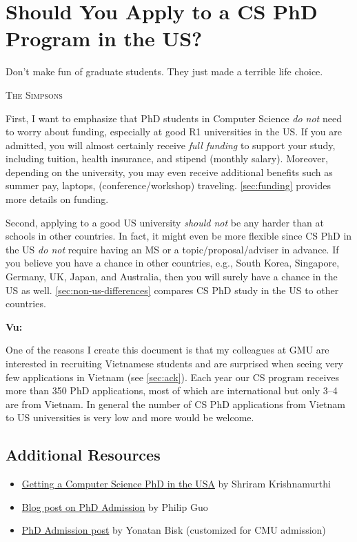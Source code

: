 \documentclass[oneside,11pt]{memoir}
\newenvironment{commentbox}[1][]{
  \small
  \begin{mybox}
    {\small \textbf{#1}}
  }{
  \end{mybox}
}
\begin{document}
\mainmatter
\chapter{Should You Apply to a CS PhD Program in the US?}\label{sec:should}

\epigraph{\vspace{-0.2in} Don't make fun of graduate students. They just made a terrible life choice.}{\textsc{The Simpsons}}

First, I want to emphasize that PhD students in Computer Science \emph{do not} need to worry about funding, especially at good R1
universities in the US. If you are admitted, you will almost certainly
receive \emph{full funding} to support your study, including tuition,
health insurance, and stipend (monthly salary). Moreover, depending on the university,
you may even receive additional benefits such as summer pay, laptops, (conference/workshop) traveling. \autoref{sec:funding} provides more details on funding.

Second, applying to a good US university \emph{should not} be any harder than at schools in other countries. In fact, it might even be more flexible since CS PhD in the US \emph{do not} require having an MS or a topic/proposal/adviser in advance. If you believe you have a chance in other countries, e.g., South Korea, Singapore, Germany, UK, Japan, and Australia, then you will surely have a chance in the US as well. \autoref{sec:non-us-differences} compares CS PhD study in the US to other countries.

\begin{commentbox}[Vu:]
  One of the reasons I create this document is that my colleagues at GMU are interested in recruiting Vietnamese students and are surprised when seeing very few applications in Vietnam (see \autoref{sec:ack}). Each year our CS program receives more than 350 PhD applications, most of which are international but only 3--4 are from Vietnam. In general the number of CS PhD applications from Vietnam to US universities is very low and more would be welcome.
\end{commentbox}




\section*{Additional Resources}
\begin{itemize}
  \item \href{https://parentheticallyspeaking.org/articles/us-cs-phd-faq/}{Getting a Computer Science PhD in the USA} by Shriram Krishnamurthi
  \item  \href{https://pg.ucsd.edu/PhD-application-tips.htm}{Blog post on PhD Admission} by Philip Guo
  \item   \href{https://talkingtorobots.com/yonatanbisk.html}{PhD Admission post} by Yonatan Bisk (customized for CMU admission)
\end{itemize}
\end{document}
